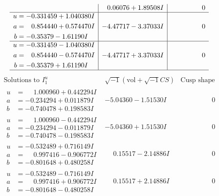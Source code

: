 \documentclass[1p]{elsarticle_modified}
\theoremstyle{definition}
\newcommand{\I}{\sqrt{-1}}
\begin{document}
$$\begin{array}{c|c|c}
 & \phantom{-}0.06076 + 1.89508 I & \phantom{-0.000000 } 0 \\ \hline\begin{aligned}
u &= -0.331459 + 1.040380 I \\
a &= \phantom{-}0.854440 + 0.574470 I \\
b &= -0.35379 - 1.61190 I\end{aligned}
 & -4.47717 - 3.37033 I & \phantom{-0.000000 } 0 \\ \hline\begin{aligned}
u &= -0.331459 - 1.040380 I \\
a &= \phantom{-}0.854440 - 0.574470 I \\
b &= -0.35379 + 1.61190 I\end{aligned}
 & -4.47717 + 3.37033 I & \phantom{-0.000000 } 0\\
 \hline 
 \end{array}$$\newpage$$\begin{array}{c|c|c}  
\text{Solutions to }I^u_{1}& \I (\text{vol} + \sqrt{-1}CS) & \text{Cusp shape}\\
 \hline 
\begin{aligned}
u &= \phantom{-}1.000960 + 0.442294 I \\
a &= -0.234294 + 0.011879 I \\
b &= -0.740478 + 0.198583 I\end{aligned}
 & -5.04360 - 1.51530 I & \phantom{-0.000000 } 0 \\ \hline\begin{aligned}
u &= \phantom{-}1.000960 - 0.442294 I \\
a &= -0.234294 - 0.011879 I \\
b &= -0.740478 - 0.198583 I\end{aligned}
 & -5.04360 + 1.51530 I & \phantom{-0.000000 } 0 \\ \hline\begin{aligned}
u &= -0.532489 + 0.716149 I \\
a &= \phantom{-}0.997416 - 0.906772 I \\
b &= -0.801648 + 0.480258 I\end{aligned}
 & \phantom{-}0.15517 - 2.14886 I & \phantom{-0.000000 } 0 \\ \hline\begin{aligned}
u &= -0.532489 - 0.716149 I \\
a &= \phantom{-}0.997416 + 0.906772 I \\
b &= -0.801648 - 0.480258 I\end{aligned}
 & \phantom{-}0.15517 + 2.14886 I & \phantom{-0.000000 } 0 \\ \hline\begin{aligned}

\end{aligned}
\end{array}$$
\end{document}
